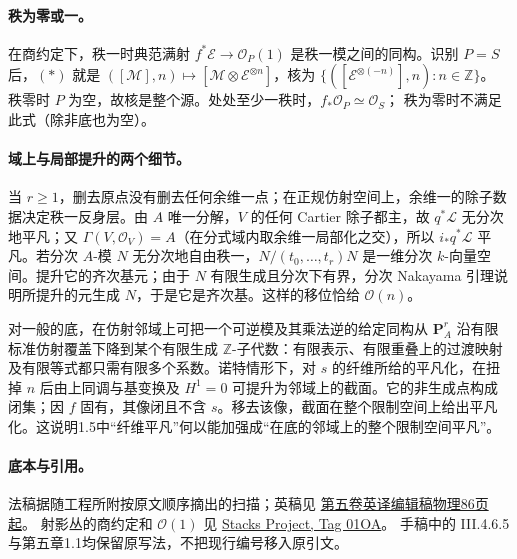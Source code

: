 \documentclass[openany,fontset=fandol]{ctexbook}
\newcommand{\OO}{\mathcal O}
\newcommand{\LL}{\mathcal L}
\newcommand{\MM}{\mathcal M}
\newcommand{\EE}{\mathcal E}
\begin{document}
\paragraph{秩为零或一。}
在商约定下，秩一时典范满射 \(f^*\EE\to\OO_P(1)\) 是秩一模之间的同构。识别 \(P=S\) 后，\((*)\) 就是
\(([\MM],n)\mapsto[\MM\otimes\EE^{\otimes n}]\)，核为
\(\{([\EE^{\otimes(-n)}],n):n\in\mathbb Z\}\)。
秩零时 \(P\) 为空，故核是整个源。处处至少一秩时，\(f_*\OO_P\simeq\OO_S\)； 秩为零时不满足此式（除非底也为空）。

\paragraph{域上与局部提升的两个细节。}
当 \(r\ge1\)，删去原点没有删去任何余维一点；在正规仿射空间上，余维一的除子数据决定秩一反身层。由 \(A\) 唯一分解，\(V\) 的任何 Cartier 除子都主，故 \(q^*\LL\) 无分次地平凡；又 \(\Gamma(V,\OO_V)=A\)（在分式域内取余维一局部化之交），所以 \(i_*q^*\LL\) 平凡。若分次 \(A\)-模 \(N\) 无分次地自由秩一，\(N/(t_0,\ldots,t_r)N\) 是一维分次 \(k\)-向量空间。提升它的齐次基元；由于 \(N\) 有限生成且分次下有界，分次 Nakayama 引理说明所提升的元生成 \(N\)，于是它是齐次基。这样的移位恰给 \(\OO(n)\)。

对一般的底，在仿射邻域上可把一个可逆模及其乘法逆的给定同构从 \(\mathbf P_A^r\) 沿有限标准仿射覆盖下降到某个有限生成 \(\mathbb Z\)-子代数：有限表示、有限重叠上的过渡映射及有限等式都只需有限多个系数。诺特情形下，对 \(s\) 的纤维所给的平凡化，在扭掉 \(n\) 后由上同调与基变换及 \(H^1=0\) 可提升为邻域上的截面。它的非生成点构成闭集；因 \(f\) 固有，其像闭且不含 \(s\)。移去该像，截面在整个限制空间上给出平凡化。这说明1.5中“纤维平凡”何以能加强成“在底的邻域上的整个限制空间平凡”。

\paragraph{底本与引用。}
法稿据随工程所附按原文顺序摘出的扫描；英稿见
\href{https://webusers.imj-prg.fr/~leila.schneps/grothendieckcircle/EGA/EGA5trans.pdf#page=86}{第五卷英译编辑稿物理86页起}。
射影丛的商约定和 \(\OO(1)\) 见
\href{https://stacks.math.columbia.edu/tag/01OA}{Stacks Project, Tag 01OA}。
手稿中的 III.4.6.5 与第五章1.1均保留原写法，不把现行编号移入原引文。
\end{document}
